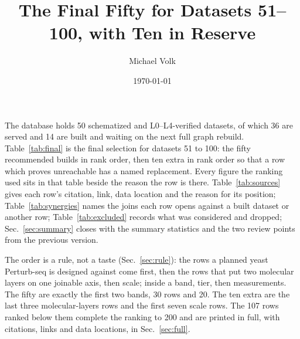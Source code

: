 \documentclass[10pt,a4paper]{article}
\title{\vspace{-1.5em}The Final Fifty for Datasets 51--100, with Ten in Reserve}
\author{Michael Volk}
\date{\today}
\begin{document}
\maketitle
\thispagestyle{empty}

\noindent
The database holds 50 schematized and L0--L4-verified 
datasets, of which 36 are served and 14 are built and waiting on the next full graph
rebuild. Table~\ref{tab:final} is the final selection for datasets 51 to 100: the fifty
recommended builds in rank order, then ten extra in rank order so that a row which proves
unreachable has a named replacement. Every figure the ranking used sits in that table
beside the reason the row is there. Table~\ref{tab:sources} gives each row's citation, link,
data location and the reason for its position; Table~\ref{tab:synergies} names the joins
each row opens against a built dataset or another row; Table~\ref{tab:excluded} records
what was considered and dropped; Sec.~\ref{sec:summary} closes with the summary
statistics and the two review points from the previous version.

The order is a rule, not a taste (Sec.~\ref{sec:rule}): the rows a planned yeast
Perturb-seq is designed against come first, then the rows that put two molecular layers on
one joinable axis, then scale; inside a band, tier, then measurements. The fifty are exactly
the first two bands, 30 rows and 20. The ten extra are the last three molecular-layers rows
and the first seven scale rows. The 107 rows ranked below them complete the ranking to
200 and are printed in full, with citations, links and data locations, in
Sec.~\ref{sec:full}.

\vspace{0.5em}
\tccontents
\clearpage







\end{document}
